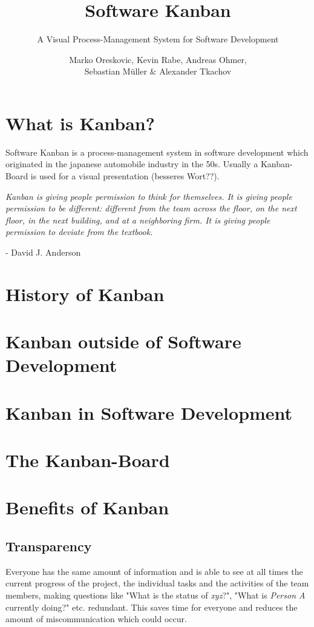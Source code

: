 \documentclass[12pt]{scrartcl}
\title{Software Kanban}
\subtitle{A Visual Process-Management System for Software Development}
\author{Marko Oreskovic, Kevin Rabe, Andreas Ohmer,\\ Sebastian Müller \& Alexander Tkachov}
\date{}
\begin{document}
	\maketitle
		
	\tableofcontents
	\newpage
	
	\section{What is Kanban?}
		Software Kanban is a process-management system in software development which originated in the japanese automobile industry in the 50s. Usually a Kanban-Board is used for a visual {\color{red}presentation (besseres Wort??)}.
		
		\vspace{0.5cm}
		
		\begin{displayquote}
			\textit{Kanban is giving people permission to think for themselves. It is giving people permission to be different: different from the team across the floor, on the next floor, in the next building, and at a neighboring firm. It is giving people permission to deviate from the textbook.} 
		\end{displayquote}
		\hfill - David J. Anderson
	
	\section{History of Kanban}
	
	
	\section{Kanban outside of Software Development}
	
	
	\section{Kanban in Software Development}
	
	
	\section{The Kanban-Board}
	
	\newpage
	
	\section{Benefits of Kanban}
		\subsection{Transparency}
			Everyone has the same amount of information and is able to see at all times the current progress of the project, the individual tasks and the activities of the team members, making questions like "What is the status of \textit{xyz}?", "What is \textit{Person A} currently doing?" etc. {\color{red}redundant}. This saves time for everyone and reduces the amount of miscommunication which could occur. \\
			
\end{document}
